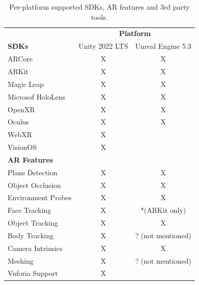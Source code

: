 \documentclass{vgtc}                          %
\begin{document}
\begin{table}[h!]
	\centering

	\begin{tabular}{l c c}
		\toprule
		                     & \multicolumn{2}{c}{\textbf{Platform}}                     \\
		\cmidrule(l){2-3}
		\textbf{SDKs}        & Unity 2022 LTS                        & Unreal Engine 5.3 \\
		\midrule
		ARCore               & X                                     & X                 \\
		ARKit                & X                                     & X                 \\
		Magic Leap           & X                                     & X                 \\
		Microsof HoloLens    & X                                     & X                 \\
		OpenXR               & X                                     & X                 \\
		Oculus               & X                                     & X                 \\
		WebXR                & X                                     &                   \\
		VisionOS             & X                                     &                   \\
		\midrule
		\textbf{AR Features} &                                       &                   \\
		\midrule
		Plane Detection      & X                                     & X                 \\
		Object Occlusion     & X                                     & X                 \\
		Environment Probes   & X                                     & X                 \\
		Face Tracking        & X                                     & *(ARKit only)     \\
		Object Tracking      & X                                     & X                 \\
		Body Tracking        & X                                     & ? (not mentioned) \\
		Camera Intrinsics    & X                                     & X                 \\
		Meshing              & X                                     & ? (not mentioned) \\
		\midrule
		Vuforia Support      & X                                     &                   \\
		\bottomrule
	\end{tabular}


	\medskip

	\caption{Per-platform supported SDKs, AR features and 3rd party tools.}
	\label{table:1}
\end{table}
\end{document}

